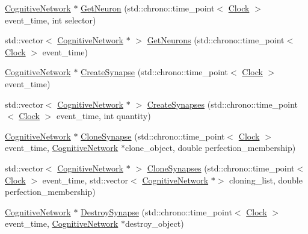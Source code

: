 \begin{DoxyCompactItemize}
\item 
\hyperlink{class_cognitive_network}{Cognitive\+Network} $\ast$ \hyperlink{class_cognitive_network_ac12f0af92d878d45dca7303dc065c383}{Get\+Neuron} (std\+::chrono\+::time\+\_\+point$<$ \hyperlink{universe_8h_a0ef8d951d1ca5ab3cfaf7ab4c7a6fd80}{Clock} $>$ event\+\_\+time, int selector)
\item 
std\+::vector$<$ \hyperlink{class_cognitive_network}{Cognitive\+Network} $\ast$ $>$ \hyperlink{class_cognitive_network_a0e9e37e976a7ca5ee625e2d7b36fd7ea}{Get\+Neurons} (std\+::chrono\+::time\+\_\+point$<$ \hyperlink{universe_8h_a0ef8d951d1ca5ab3cfaf7ab4c7a6fd80}{Clock} $>$ event\+\_\+time)
\item 
\hyperlink{class_cognitive_network}{Cognitive\+Network} $\ast$ \hyperlink{class_cognitive_network_ade8e9295b35790b136dca9084a1b7aa9}{Create\+Synapse} (std\+::chrono\+::time\+\_\+point$<$ \hyperlink{universe_8h_a0ef8d951d1ca5ab3cfaf7ab4c7a6fd80}{Clock} $>$ event\+\_\+time)
\item 
std\+::vector$<$ \hyperlink{class_cognitive_network}{Cognitive\+Network} $\ast$ $>$ \hyperlink{class_cognitive_network_ae6ae16f401e7699032ac9459132763c0}{Create\+Synapses} (std\+::chrono\+::time\+\_\+point$<$ \hyperlink{universe_8h_a0ef8d951d1ca5ab3cfaf7ab4c7a6fd80}{Clock} $>$ event\+\_\+time, int quantity)
\item 
\hyperlink{class_cognitive_network}{Cognitive\+Network} $\ast$ \hyperlink{class_cognitive_network_a40f88d3ce9d386ee4db5c1e0ad84dad2}{Clone\+Synapse} (std\+::chrono\+::time\+\_\+point$<$ \hyperlink{universe_8h_a0ef8d951d1ca5ab3cfaf7ab4c7a6fd80}{Clock} $>$ event\+\_\+time, \hyperlink{class_cognitive_network}{Cognitive\+Network} $\ast$clone\+\_\+object, double perfection\+\_\+membership)
\item 
std\+::vector$<$ \hyperlink{class_cognitive_network}{Cognitive\+Network} $\ast$ $>$ \hyperlink{class_cognitive_network_a82fe792704bcbf7df56b3023266f5f70}{Clone\+Synapses} (std\+::chrono\+::time\+\_\+point$<$ \hyperlink{universe_8h_a0ef8d951d1ca5ab3cfaf7ab4c7a6fd80}{Clock} $>$ event\+\_\+time, std\+::vector$<$ \hyperlink{class_cognitive_network}{Cognitive\+Network} $\ast$$>$ cloning\+\_\+list, double perfection\+\_\+membership)
\item 
\hyperlink{class_cognitive_network}{Cognitive\+Network} $\ast$ \hyperlink{class_cognitive_network_a08b87aa9a0823355ef7cef77414dc6dc}{Destroy\+Synapse} (std\+::chrono\+::time\+\_\+point$<$ \hyperlink{universe_8h_a0ef8d951d1ca5ab3cfaf7ab4c7a6fd80}{Clock} $>$ event\+\_\+time, \hyperlink{class_cognitive_network}{Cognitive\+Network} $\ast$destroy\+\_\+object)
$$
\end{DoxyCompactItemize}
